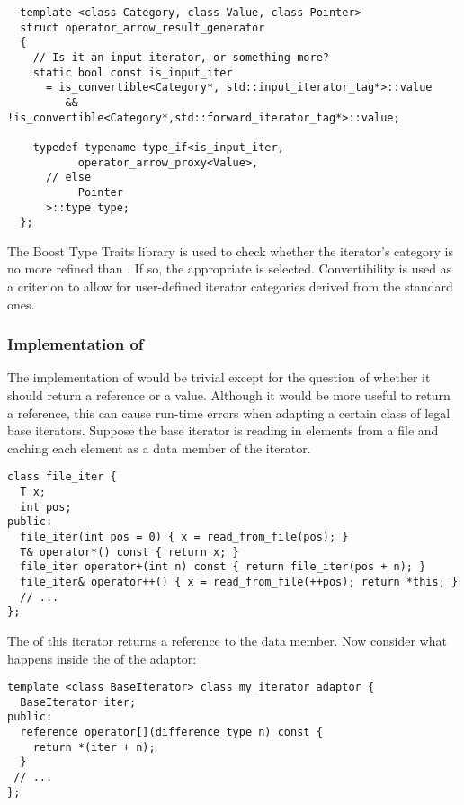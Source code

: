 \documentclass{netobjectdays}
\begin{document}
{\footnotesize
\begin{verbatim}
  template <class Category, class Value, class Pointer>
  struct operator_arrow_result_generator
  {
    // Is it an input iterator, or something more?
    static bool const is_input_iter
      = is_convertible<Category*, std::input_iterator_tag*>::value
         && !is_convertible<Category*,std::forward_iterator_tag*>::value;

    typedef typename type_if<is_input_iter,
           operator_arrow_proxy<Value>,
      // else
           Pointer
      >::type type;
  };
\end{verbatim}
}

The Boost Type Traits library is used to check whether the iterator's
category is no more refined than . If so,
the appropriate  is selected.
Convertibility is used as a criterion to allow for user-defined
iterator categories derived from the standard ones.


\subsubsection{Implementation of }
\label{sec:op-bracket-impl}

The implementation of  would be trivial except for
the question of whether it should return a reference or a
value. Although it would be more useful to return a reference, this
can cause run-time errors when adapting a certain class of legal base
iterators.  Suppose the base iterator is reading in elements from a
file and caching each element as a data member of the iterator.

{\footnotesize
\begin{verbatim}
class file_iter {
  T x;
  int pos;
public:
  file_iter(int pos = 0) { x = read_from_file(pos); }
  T& operator*() const { return x; }
  file_iter operator+(int n) const { return file_iter(pos + n); }
  file_iter& operator++() { x = read_from_file(++pos); return *this; }
  // ...
};
\end{verbatim}
}

\noindent The  of this iterator returns a reference to
the data member. Now consider what happens inside the
 of the adaptor:

{\footnotesize
\begin{verbatim}
template <class BaseIterator> class my_iterator_adaptor {
  BaseIterator iter;
public:
  reference operator[](difference_type n) const {
    return *(iter + n);
  }
 // ...
};
\end{verbatim}
}
\end{document}
